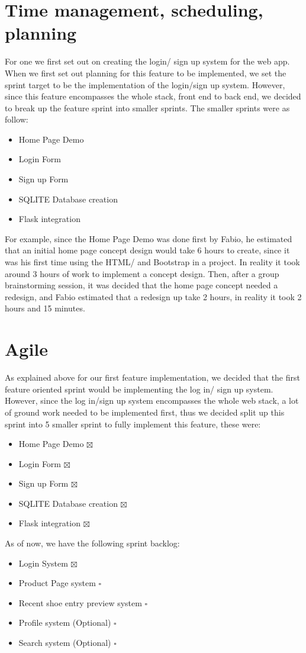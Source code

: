 \section{Time management, scheduling, planning}
For one we first set out on creating the login/ sign up system for the web app. When we first set out planning for this feature to be implemented, we set the sprint target to be the implementation of the login/sign up system. However, since this feature encompasses the whole stack, front end to back end, we decided to break up the feature sprint into smaller sprints. The smaller sprints were as follow:
\begin{itemize}
  \item Home Page Demo
  \item Login Form
  \item Sign up Form
  \item SQLITE Database creation
  \item Flask integration
\end{itemize}
For example, since the Home Page Demo was done first by Fabio, he estimated that an initial home page concept design would take 6 hours to create, since it was his first time using the HTML/ and Bootstrap in a project. In reality it took around 3 hours of work to implement a concept design. Then, after a group brainstorming session, it was decided that the home page concept needed a redesign, and Fabio estimated that a redesign up take 2 hours, in reality it took 2 hours and 15 minutes.
\section{Agile}
As explained above for our first feature implementation, we decided that the first feature oriented sprint would be implementing the log in/ sign up system. However, since the log in/sign up system encompasses the whole web stack, a lot of ground work needed to be implemented first, thus we decided split up this sprint into 5 smaller sprint to fully implement this feature, these were:
\begin{itemize}
  \item Home Page Demo $\boxtimes$
  \item Login Form $\boxtimes$
  \item Sign up Form $\boxtimes$
  \item SQLITE Database creation $\boxtimes$
  \item Flask integration $\boxtimes$
\end{itemize}
As of now, we have the following sprint backlog:
\begin{itemize}
  \item Login System $\boxtimes$
  \item Product Page system $\square$
  \item Recent shoe entry preview system $\square$
  \item Profile system (Optional) $\square$
  \item Search system (Optional) $\square$
\end{itemize}
